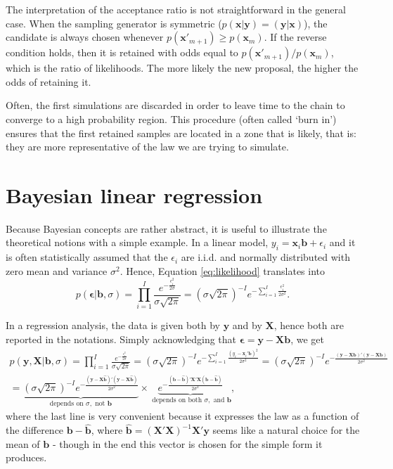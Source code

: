 \documentclass[]{krantz}
\theoremstyle{definition}
\theoremstyle{definition}
\theoremstyle{definition}
\theoremstyle{remark}
\begin{document}
The interpretation of the acceptance ratio is not straightforward in the
general case. When the sampling generator is symmetric
(\(p(\textbf{x}|\textbf{y})=(\textbf{y}|\textbf{x})\)), the candidate is
always chosen whenever \(p(\textbf{x}'_{m+1})\ge p(\textbf{x}_{m})\). If
the reverse condition holds, then it is retained with odds equal to
\(p(\textbf{x}'_{m+1})/p(\textbf{x}_{m})\), which is the ratio of
likelihoods. The more likely the new proposal, the higher the odds of
retaining it.

Often, the first simulations are discarded in order to leave time to the
chain to converge to a high probability region. This procedure (often
called `burn in') ensures that the first retained samples are located in
a zone that is likely, that is: they are more representative of the law
we are trying to simulate.

\hypertarget{bayesian-linear-regression}{%
\section{Bayesian linear regression}\label{bayesian-linear-regression}}

Because Bayesian concepts are rather abstract, it is useful to
illustrate the theoretical notions with a simple example. In a linear
model, \(y_i=\textbf{x}_i\textbf{b}+\epsilon_i\) and it is often
statistically assumed that the \(\epsilon_i\) are i.i.d. and normally
distributed with zero mean and variance \(\sigma^2\). Hence, Equation
\eqref{eq:likelihood} translates into
\[p(\boldsymbol{\epsilon}|\textbf{b}, \sigma)=\prod_{i=1}^I\frac{e^{-\frac{\epsilon_i^2}{2\sigma}}}{\sigma\sqrt{2\pi}}=(\sigma\sqrt{2\pi})^{-I}e^{-\sum_{i=1}^I\frac{\epsilon_i^2}{2\sigma^2}}.\]

In a regression analysis, the data is given both by \(\textbf{y}\) and
by \(\textbf{X}\), hence both are reported in the notations. Simply
acknowledging that \(\boldsymbol{\epsilon}=\textbf{y}-\textbf{Xb}\), we
get \begin{align}
p(\textbf{y},\textbf{X}|\textbf{b}, \sigma)=\prod_{i=1}^I\frac{e^{-\frac{\epsilon_i^2}{2\sigma}}}{\sigma\sqrt{2\pi}}=(\sigma\sqrt{2\pi})^{-I}e^{-\sum_{i=1}^I\frac{\left(y_i-\textbf{x}_i'\textbf{b}\right)^2}{2\sigma^2}}=(\sigma\sqrt{2\pi})^{-I} e^{-\frac{\left(\textbf{y}-\textbf{X}\textbf{b}\right)' \left(\textbf{y}-\textbf{X}\textbf{b}\right)}{2\sigma^2}} \nonumber \\ \label{eq:linlike}
=\underbrace{(\sigma\sqrt{2\pi})^{-I} e^{-\frac{\left(\textbf{y}-\textbf{X}\hat{\textbf{b}}\right)' \left(\textbf{y}-\textbf{X}\hat{\textbf{b}}\right)}{2\sigma^2}}}_{\text{depends on } \sigma, \text{ not } \textbf{b}}\times \underbrace{e^{-\frac{(\textbf{b}-\hat{\textbf{b}})'\textbf{X}'\textbf{X}(\textbf{b}-\hat{\textbf{b}})}{2\sigma^2}}}_{\text{ depends on both } \sigma, \text{ and } \textbf{b} },
\end{align} where the last line is very convenient because it expresses
the law as a function of the difference \(\textbf{b}-\hat{\textbf{b}}\),
where
\(\hat{\textbf{b}}=(\textbf{X}'\textbf{X})^{-1}\textbf{X}'\textbf{y}\)
seems like a natural choice for the mean of \(\textbf{b}\) - though in
the end this vector is chosen for the simple form it produces.
\end{document}
